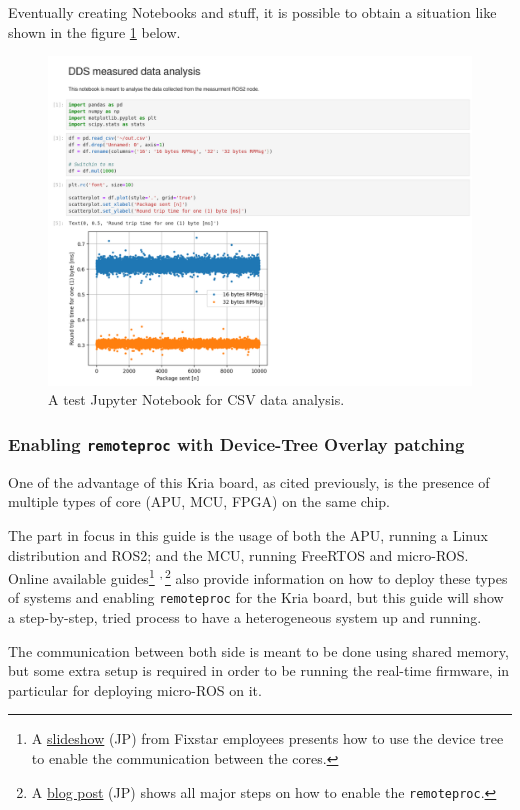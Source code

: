 \documentclass[10pt]{article}
\begin{document}
Eventually creating Notebooks and stuff, it is possible to obtain a situation like shown in the figure \ref{fig:org170033a} below.

\begin{figure}[htbp]
\centering
\includegraphics[width=.6\textwidth]{img/jupyter.png}
\caption{\label{fig:org170033a}A test Jupyter Notebook for CSV data analysis.}
\end{figure}

\subsubsection{Enabling \texttt{remoteproc} with Device-Tree Overlay patching}
\label{sec:org9f8bd3b}
One of the advantage of this Kria board, as cited previously, is the presence of
multiple types of core (APU, MCU, FPGA) on the same chip.

The part in focus in this guide is the usage of both the APU, running
a Linux distribution and ROS2; and the MCU, running FreeRTOS and micro-ROS.
Online available guides\footnote{A \href{https://speakerdeck.com/fixstars/fpga-seminar-12-fixstars-corporation-20220727}{slideshow} (JP) from Fixstar employees presents how to use the device
tree to enable the communication between the cores.} \textsuperscript{,}\,\footnote{A \href{https://zenn.dev/ryuz88/articles/kv260\_setup\_memo\_ubuntu22 }{blog post} (JP) shows all major steps on how to enable the \texttt{remoteproc}.} also provide information on how to deploy these types
of systems and enabling \texttt{remoteproc} for the Kria board, but this guide
will show a step-by-step, tried process to have a heterogeneous system
up and running.

The communication between both side is meant to be done using shared memory, but
some extra setup is required in order to be running the real-time firmware, in particular
for deploying micro-ROS on it.
\end{document}
